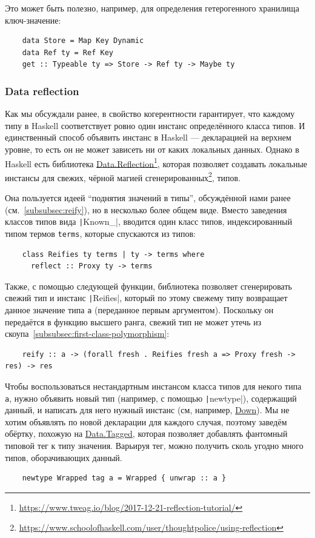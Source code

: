 Это может быть полезно, например, для определения гетерогенного хранилища ключ-значение:
\begin{verbatim}
    data Store = Map Key Dynamic
    data Ref ty = Ref Key
    get :: Typeable ty => Store -> Ref ty -> Maybe ty
\end{verbatim}

\subsubsection{Data reflection} \label{subsubsec:data-reflection}

Как мы обсуждали ранее, в свойство когерентности гарантирует, что каждому типу в Haskell соответствует ровно один инстанс определённого класса типов.
И единственный способ объявить инстанс в Haskell --- декларацией на верхнем уровне, то есть он не может зависеть ни от каких локальных данных.
Однако в Haskell есть библиотека \href{https://hackage.haskell.org/package/reflection-2.1.6/docs/Data-Reflection.html}{Data.Reflection}\footnote{\url{https://www.tweag.io/blog/2017-12-21-reflection-tutorial/}}, которая позволяет создавать локальные инстансы для свежих, чёрной магией сгенерированных\footnote{\url{https://www.schoolofhaskell.com/user/thoughtpolice/using-reflection}}, типов.

Она пользуется идеей ``поднятия значений в типы'', обсуждённой нами ранее (см.~\ref{subsubsec:reify}), но в несколько более общем виде.
Вместо заведения классов типов вида \texttt|Known_|, вводится один класс типов, индексированный типом термов \texttt{terms}, которые спускаются из типов:
\begin{verbatim}
    class Reifies ty terms | ty -> terms where
      reflect :: Proxy ty -> terms
\end{verbatim}

Также, с помощью следующей функции, библиотека позволяет сгенерировать свежий тип и инстанс \texttt|Reifies|, который по этому свежему типу возвращает данное значение типа \texttt{a} (переданное первым аргументом).
Поскольку он передаётся в функцию высшего ранга, свежий тип не может утечь из скоупа~\ref{subsubsec:first-class-polymorphism}:
\begin{verbatim}
    reify :: a -> (forall fresh . Reifies fresh a => Proxy fresh -> res) -> res
\end{verbatim}

Чтобы воспользоваться нестандартным инстансом класса типов для некого типа \texttt{a}, нужно объявить новый тип (например, с помощью \texttt|newtype|), содержащий данный, и написать для него нужный инстанс (см, например, \href{https://hackage.haskell.org/package/base-4.20.0.1/docs/Data-Ord.html#t:Down}{Down}).
Мы не хотим объявлять по новой декларации для каждого случая, поэтому заведём обёртку, похожую на \href{https://hackage.haskell.org/package/tagged-0.8.8/docs/Data-Tagged.html}{Data.Tagged}, которая позволяет добавлять фантомный типовой тег к типу значения.
Варьируя тег, можно получить сколь угодно много типов, оборачивающих данный.
\begin{verbatim}
    newtype Wrapped tag a = Wrapped { unwrap :: a }
\end{verbatim}

